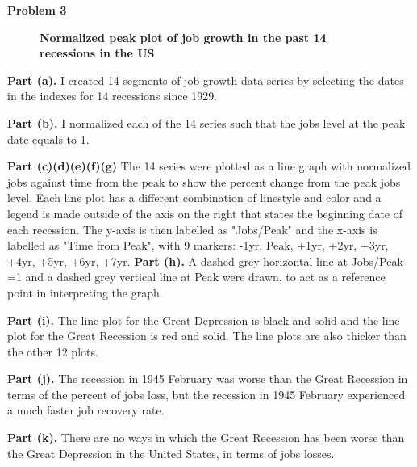 \documentclass[letterpaper,12pt]{article}
\theoremstyle{definition}
\begin{document}
\newpage
\noindent\textbf{Problem 3}\\
\begin{figure}[htb]\centering\captionsetup{width=4.0in}
  \caption{\textbf{Normalized peak plot of job growth in the past 14 recessions in the US}}\label{FigExample}
\end{figure}

\textbf{Part (a).}
\flushleft I created 14 segments of job growth data series by selecting the dates in the indexes for 14 recessions since 1929.
\flushleft

\textbf{Part (b).}
\flushleft I normalized each of the 14 series such that the jobs level at the peak date equals to 1.
\flushleft

\textbf{Part (c)(d)(e)(f)(g)}
\flushleft The 14 series were plotted as a line graph with normalized jobs against time from the peak to show the percent change from the peak jobs level. Each line plot has a different combination of linestyle and color and a legend is made outside of the axis on the right that states the beginning date of each recession. The y-axis is then labelled as "Jobs/Peak" and the x-axis is labelled as "Time from Peak", with 9 markers:  -1yr, Peak, +1yr, +2yr, +3yr, +4yr, +5yr, +6yr, +7yr. 
\newpage
\textbf{Part (h).}
\flushleft A dashed grey horizontal line at Jobs/Peak =1 and a dashed grey vertical line at Peak were drawn, to act as a reference point in interpreting the graph.
\flushleft

\textbf{Part (i).}
\flushleft The line plot for the Great Depression is black and solid and the line plot for the Great Recession is red and solid. The line plots are also thicker than the other 12 plots.
\flushleft

\textbf{Part (j).}
\flushleft The recession in 1945 February was worse than the Great Recession in terms of the percent of jobs loss, but the recession in 1945 February experienced a much faster job recovery rate.
\flushleft

\textbf{Part (k).}
\flushleft There are no ways in which the Great Recession has been worse than the Great Depression in the United States, in terms of jobs losses.
\flushleft
\end{document}

